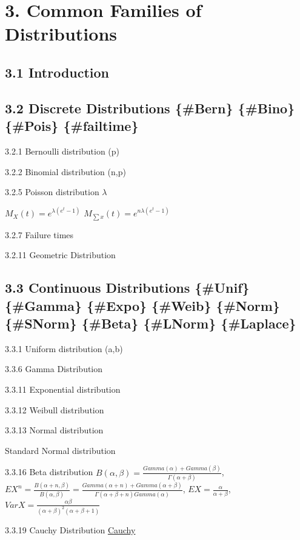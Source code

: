 \documentclass[10pt,twocolumn,portrait]{article}
\begin{document}
\hypertarget{common-families-of-distributions}{%
\section{3. Common Families of
Distributions}\label{common-families-of-distributions}}

\hypertarget{introduction}{%
\subsection{3.1 Introduction}\label{introduction}}

\hypertarget{Geom}{%
\subsection{3.2 Discrete Distributions \{\#Bern\} \{\#Bino\} \{\#Pois\}
\{\#failtime\}}\label{Geom}}

3.2.1 Bernoulli distribution (p)

3.2.2 Binomial distribution (n,p)

3.2.5 Poisson distribution \(\lambda\)

\(M_X(t)=e^{\lambda(e^t-1)}\) \(M_{\sum x}(t)=e^{n\lambda(e^t-1)}\)

3.2.7 Failure times

3.2.11 Geometric Distribution

\hypertarget{SPower}{%
\subsection{3.3 Continuous Distributions \{\#Unif\} \{\#Gamma\}
\{\#Expo\} \{\#Weib\} \{\#Norm\} \{\#SNorm\} \{\#Beta\} \{\#LNorm\}
\{\#Laplace\}}\label{SPower}}

3.3.1 Uniform distribution (a,b)

3.3.6 Gamma Distribution

3.3.11 Exponential distribution

3.3.12 Weibull distribution

3.3.13 Normal distribution

Standard Normal distribution

3.3.16 Beta distribution
\(B(\alpha,\beta)=\frac{Gamma(\alpha)+Gamma(\beta)}{\Gamma(\alpha+\beta)}\),
\(EX^n=\frac{B(\alpha+n,\beta)}{B(\alpha,\beta)}=\frac{Gamma(\alpha+n)+Gamma(\alpha+\beta)}{\Gamma(\alpha+\beta+n)Gamma(\alpha)}\),
\(EX=\frac{\alpha} {\alpha+\beta}\),
\(VarX=\frac{\alpha\beta}{(\alpha+\beta)^2(\alpha+\beta+1)}\)

3.3.19 Cauchy Distribution \protect\hyperlink{Cauchy}{Cauchy}
\end{document}
